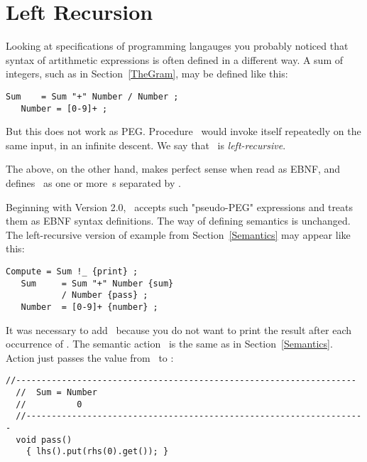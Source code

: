 
\section{Left Recursion}\label{LeftRec}


Looking at specifications of programming langauges
you probably noticed that syntax of artithmetic expressions 
is often defined in a different way.
A sum of integers, such as in Section~\ref{TheGram},
may be defined like this:
\smallskip
\small
\begin{Verbatim}[frame=single,framesep=2mm,samepage=true,xleftmargin=15mm,xrightmargin=15mm,baselinestretch=0.8]
   Sum    = Sum "+" Number / Number ;
   Number = [0-9]+ ;
\end{Verbatim}
\normalsize
But this does not work as PEG. 
Procedure \Sum\ would invoke itself repeatedly on the same input, in an infinite descent.
We say that \Sum\ is \emph{left-recursive}.

The above, on the other hand, makes perfect sense when read as EBNF,
and defines \Sum\ as one or more \Number\,s separated by .

Beginning with Version 2.0, \Mouse\ accepts such "pseudo-PEG" expressions
and treats them as EBNF syntax definitions.
The way of defining semantics is unchanged.
The left-recursive version of example from Section~\ref{Semantics} may appear like this:

\smallskip 
\small
\begin{Verbatim}[frame=single,framesep=2mm,samepage=true,xleftmargin=15mm,xrightmargin=15mm,baselinestretch=0.8]
   Compute = Sum !_ {print} ;
   Sum     = Sum "+" Number {sum}
           / Number {pass} ;
   Number  = [0-9]+ {number} ;
\end{Verbatim}
\normalsize

It was necessary to add \Compute\ because you do not want to print the result
after each occurrence of \Sum.
The semantic action \Numbera\ is the same as in Section~\ref{Semantics}.
Action  just passes the value from \Number\ to \Sum:

\smallskip 
\small
\begin{Verbatim}[frame=single,framesep=2mm,samepage=true,xleftmargin=15mm,xrightmargin=15mm,baselinestretch=0.8]
  //-------------------------------------------------------------------
  //  Sum = Number
  //          0
  //-------------------------------------------------------------------
  void pass()
    { lhs().put(rhs(0).get()); }
\end{Verbatim}
\normalsize

